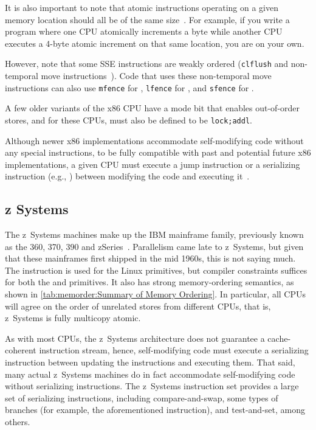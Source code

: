 It is also important to note that atomic instructions operating
on a given memory location should all be of the same
size~\cite[Section 8.1.2.2]{Intel64IA32v3A2011}.
For example, if you write a program where one CPU atomically increments
a byte while another CPU executes a 4-byte atomic increment on
that same location, you are on your own.

However, note that some SSE instructions are weakly ordered ({\tt clflush}
and non-temporal move instructions~\cite{IntelXeonV2b-96a}).
Code that uses these non-temporal move instructions
can also use {\tt mfence} for ,
{\tt lfence} for , and {\tt sfence} for .

A few older variants of the x86 CPU have a mode bit that enables out-of-order
stores, and for these CPUs,  must also be defined to
be {\tt lock;addl}.

Although newer x86 implementations accommodate self-modifying code
without any special instructions, to be fully compatible with
past and potential future x86 implementations, a given CPU must
execute a jump instruction or a serializing instruction (e.g., )
between modifying the code and executing
it~\cite[Section 8.1.3]{Intel64IA32v3A2011}.

\subsection{z Systems}

The z~Systems machines make up the IBM mainframe family, previously
known as the 360, 370, 390 and zSeries~\cite{IBMzSeries04a}.
Parallelism came late to z~Systems, but given that these mainframes first
shipped in the mid 1960s, this is not saying much.
The  instruction is used for the Linux  primitives,
but compiler constraints suffices for both the
 and  primitives.
It also has strong memory-ordering semantics, as shown in
\cref{tab:memorder:Summary of Memory Ordering}.
In particular, all CPUs
will agree on the order of unrelated stores from different CPUs,
that is, z~Systems is fully multicopy atomic.

As with most CPUs, the z~Systems architecture does not guarantee a
cache-coherent instruction stream, hence,
self-modifying code must execute a serializing instruction between updating
the instructions and executing them.
That said, many actual z~Systems machines do in fact accommodate self-modifying
code without serializing instructions.
The z~Systems instruction set provides a large set of serializing instructions,
including compare-and-swap, some types of branches (for example, the
aforementioned  instruction), and test-and-set,
among others.

